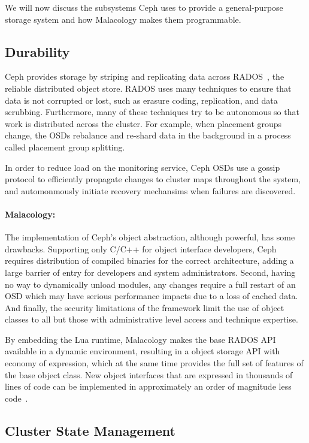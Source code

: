 \documentclass[10pt,twocolumn]{article}
\begin{document}
We will now discuss the subsystems Ceph uses to provide a general-purpose
storage system and how Malacology makes them programmable.

\subsection{Durability}
\label{sec:durability}

Ceph provides storage by striping and replicating data across
RADOS~\cite{weil_rados_2007}, the reliable distributed object store. RADOS
uses many techniques to ensure that data is not corrupted or lost, such as
erasure coding, replication, and data scrubbing. Furthermore, many of these
techniques try to be autonomous so that work is distributed across the
cluster. For example, when placement groups change, the OSDs rebalance and
re-shard data in the background in a process called placement group splitting.

In order to reduce load on the monitoring service, Ceph OSDs use a gossip
protocol to efficiently propagate changes to cluster maps throughout the
system, and automonmously initiate recovery mechansims when failures are
discovered.

\paragraph*{Malacology:} The implementation of Ceph's object abstraction, although powerful, has some 
drawbacks.
Supporting only C/C++ for object interface developers, Ceph requires
distribution of compiled binaries for the correct architecture, adding a
large barrier of entry for developers and system administrators. Second,
having no way to dynamically unload modules, any changes require a full
restart of an OSD which may have serious performance impacts due to a loss
of cached data. And finally, the security limitations of the framework
limit the use of object classes to all but those with administrative level
access and technique expertise.

By embedding the Lua runtime, Malacology makes the base RADOS API available in a 
dynamic environment, resulting in a object storage API with economy of 
expression, which at the same time provides the full set of features of the base 
object class. New object interfaces that are expressed in thousands of lines of 
code can be implemented in approximately an order of magnitude less 
code~\cite{geambasu_comet_2010}.

\subsection{Cluster State Management}
\label{consistencyversioning-of-cluster-state}
\end{document}
